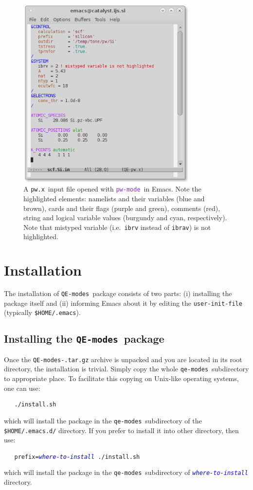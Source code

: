 \documentclass[12pt,a4paper]{article}
\def\pwx{\texttt{pw.x}}
\def\QEmodes{\texttt{QE-modes}}
\def\qemodes{\texttt{qe-modes}}
\def\efn#1{\textcolor{BlueViolet}{\texttt{#1}}}
\def\var#1{\textcolor{Blue}{\texttt{\textit{#1}}}}
\def\pwmode{\efn{pw-mode}}
\begin{document}
\begin{figure}[htb]
  \centering
  \includegraphics[width=0.8\textwidth]{highlight.png}
  \caption{A \pwx\ input file opened with \pwmode\ in Emacs. Note the
    highlighted elements: namelists and their variables (blue and
    brown), cards and their flags (purple and green), comments (red),
    string and logical variable values (burgundy and cyan,
    respectively). Note that mistyped variable (i.e.\ \texttt{ibrv}
    instead of \texttt{ibrav}) is not highlighted.}
  \label{fig:example}
\end{figure}
    
\section{Installation}

The installation of \QEmodes\ package consists of two parts: (i)
installing the package itself and (ii) informing Emacs about it by
editing the \verb+user-init-file+ (typically \verb+$HOME/.emacs+).

\subsection{Installing the \QEmodes\ package}
Once the \texttt{QE-modes-\version.tar.gz} archive is unpacked and you
are located in its root directory, the installation is trivial. Simply
copy the whole \qemodes\ subdirectory to appropriate place. To
facilitate this copying on Unix-like operating systems, one can use:
\begin{verbatim}
   ./install.sh
\end{verbatim}
which will install the package in the \qemodes\ subdirectory of the
\texttt{\$HOME/.emacs.d/} directory. If you prefer to install it into
other directory, then use:
\begin{flushleft}
\verb+   prefix=+\var{where-to-install}\verb+ ./install.sh+
\end{flushleft}
which will install the package in the \qemodes\ subdirectory of
\var{where-to-install} directory.
\end{document}
